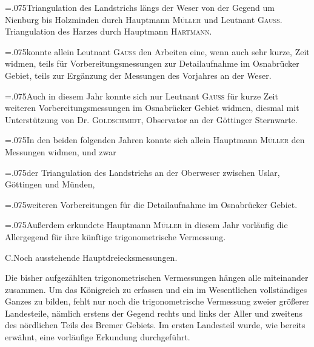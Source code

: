 {\hangindent=.075\linewidth{}\noindent{}\enspace Triangulation des Landstrichs längs der Weser von der Gegend um Nienburg bis Holzminden durch Hauptmann \textsc{Müller} und Leutnant \textsc{Gauss}. Triangulation des Harzes durch Hauptmann \textsc{Hartmann}.\par}

{\hangindent=.075\linewidth{}\noindent{}konnte allein Leutnant \textsc{Gauss} den Arbeiten eine, wenn auch sehr kurze, Zeit widmen, teils für Vorbereitungsmessungen zur Detailaufnahme im Osnabrücker Gebiet, teils zur Ergänzung der Messungen des Vorjahres an der Weser.\par}

{\hangindent=.075\linewidth{}\noindent{}\enspace Auch in diesem Jahr konnte sich nur Leutnant \textsc{Gauss} für kurze Zeit weiteren Vorbereitungsmessungen im Osnabrücker Gebiet widmen, diesmal mit Unterstützung von Dr. \textsc{Goldschmidt}, Observator an der Göttinger Sternwarte.\par}

{\leftskip=.075\linewidth\noindent In den beiden folgenden Jahren konnte sich allein Hauptmann \textsc{Müller} den Messungen widmen, und zwar\par}

{\hangindent=.075\linewidth{}\noindent{}der Triangulation des Landstrichs an der Oberweser zwischen Uslar, Göttingen und Münden,\par}

{\hangindent=.075\linewidth{}\noindent{}weiteren Vorbereitungen für die Detailaufnahme im Osnabrücker Gebiet.\par}

{\leftskip=.075\linewidth\noindent Außerdem erkundete Hauptmann \textsc{Müller} in diesem Jahr vorläufig die Allergegend für ihre künftige trigonometrische Vermessung.\par}

\begin{center}
C.\quad Noch ausstehende Hauptdreiecksmessungen.
\end{center}

\par\noindent\hspace*{\parindent}Die bisher aufgezählten trigonometrischen Vermessungen hängen alle miteinander zusammen. Um das  Königreich zu erfassen und ein im Wesentlichen vollständiges Ganzes zu bilden, fehlt nur noch die trigonometrische Vermessung zweier größerer Landesteile, nämlich erstens der Gegend rechts und links der Aller und zweitens des nördlichen Teils des Bremer Gebiets. Im ersten Landesteil wurde, wie bereits erwähnt, eine vorläufige Erkundung durchgeführt.


